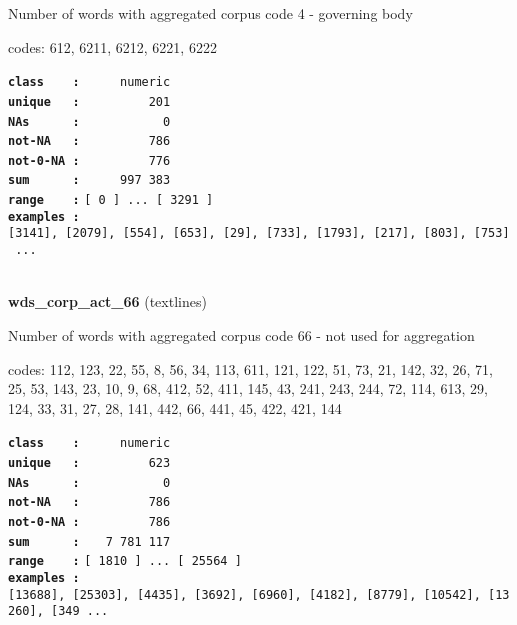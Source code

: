 \documentclass[]{article}
\begin{document}
Number of words with aggregated corpus code 4 - governing body

codes: 612, 6211, 6212, 6221, 6222

\textbf{\texttt{class\ \ \ \ :}} \texttt{~~~~~numeric}\\
\textbf{\texttt{unique\ \ \ :}} \texttt{~~~~~~~~~201}\\
\textbf{\texttt{NAs\ \ \ \ \ \ :}} \texttt{~~~~~~~~~~~0}\\
\textbf{\texttt{not-NA\ \ \ :}} \texttt{~~~~~~~~~786}\\
\textbf{\texttt{not-0-NA\ :}} \texttt{~~~~~~~~~776}\\
\textbf{\texttt{sum\ \ \ \ \ \ :}} \texttt{~~~~~997~383}\\
\textbf{\texttt{range\ \ \ \ :}}
\texttt{{[}\ 0\ {]}\ ...\ {[}\ 3291\ {]}}\\
\textbf{\texttt{examples\ :}}
\texttt{{[}3141{]},\ {[}2079{]},\ {[}554{]},\ {[}653{]},\ {[}29{]},\ {[}733{]},\ {[}1793{]},\ {[}217{]},\ {[}803{]},\ {[}753{]}\ ...}\\

~

\textbf{wds\_corp\_act\_66} (textlines)

Number of words with aggregated corpus code 66 - not used for
aggregation

codes: 112, 123, 22, 55, 8, 56, 34, 113, 611, 121, 122, 51, 73, 21, 142,
32, 26, 71, 25, 53, 143, 23, 10, 9, 68, 412, 52, 411, 145, 43, 241, 243,
244, 72, 114, 613, 29, 124, 33, 31, 27, 28, 141, 442, 66, 441, 45, 422,
421, 144

\textbf{\texttt{class\ \ \ \ :}} \texttt{~~~~~numeric}\\
\textbf{\texttt{unique\ \ \ :}} \texttt{~~~~~~~~~623}\\
\textbf{\texttt{NAs\ \ \ \ \ \ :}} \texttt{~~~~~~~~~~~0}\\
\textbf{\texttt{not-NA\ \ \ :}} \texttt{~~~~~~~~~786}\\
\textbf{\texttt{not-0-NA\ :}} \texttt{~~~~~~~~~786}\\
\textbf{\texttt{sum\ \ \ \ \ \ :}} \texttt{~~~7~781~117}\\
\textbf{\texttt{range\ \ \ \ :}}
\texttt{{[}\ 1810\ {]}\ ...\ {[}\ 25564\ {]}}\\
\textbf{\texttt{examples\ :}}
\texttt{{[}13688{]},\ {[}25303{]},\ {[}4435{]},\ {[}3692{]},\ {[}6960{]},\ {[}4182{]},\ {[}8779{]},\ {[}10542{]},\ {[}13260{]},\ {[}349\ ...}\\

~
\end{document}

